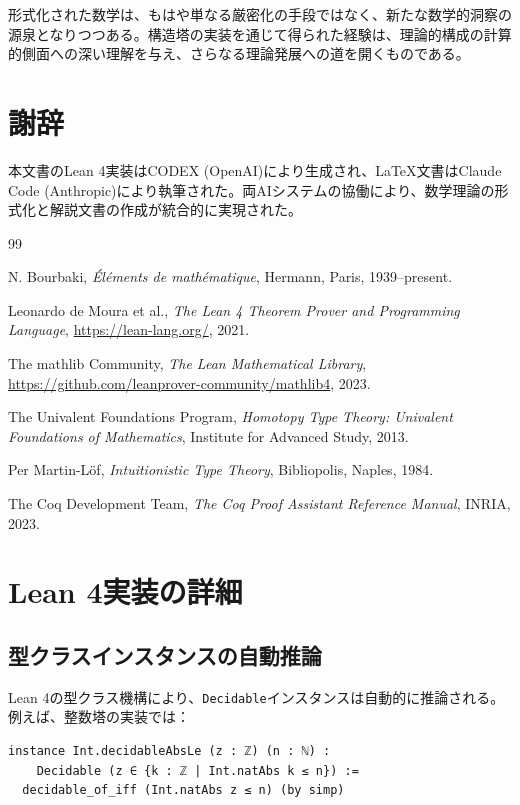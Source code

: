 \documentclass[a4paper,12pt]{ltjsarticle}
\theoremstyle{definition}
\begin{document}
形式化された数学は、もはや単なる厳密化の手段ではなく、新たな数学的洞察の源泉となりつつある。構造塔の実装を通じて得られた経験は、理論的構成の計算的側面への深い理解を与え、さらなる理論発展への道を開くものである。

\section*{謝辞}

本文書のLean 4実装はCODEX (OpenAI)により生成され、\LaTeX 文書はClaude Code (Anthropic)により執筆された。両AIシステムの協働により、数学理論の形式化と解説文書の作成が統合的に実現された。

\begin{thebibliography}{99}

N. Bourbaki, \textit{\'El\'ements de math\'ematique},
Hermann, Paris, 1939--present.

Leonardo de Moura et al., \textit{The Lean 4 Theorem Prover and Programming Language},
\url{https://lean-lang.org/}, 2021.

The mathlib Community, \textit{The Lean Mathematical Library},
\url{https://github.com/leanprover-community/mathlib4}, 2023.

The Univalent Foundations Program,
\textit{Homotopy Type Theory: Univalent Foundations of Mathematics},
Institute for Advanced Study, 2013.

Per Martin-L\"of,
\textit{Intuitionistic Type Theory},
Bibliopolis, Naples, 1984.

The Coq Development Team,
\textit{The Coq Proof Assistant Reference Manual},
INRIA, 2023.

\end{thebibliography}

\appendix

\section{Lean 4実装の詳細}

\subsection{型クラスインスタンスの自動推論}

Lean 4の型クラス機構により、\texttt{Decidable}インスタンスは自動的に推論される。例えば、整数塔の実装では：

\begin{verbatim}
instance Int.decidableAbsLe (z : ℤ) (n : ℕ) :
    Decidable (z ∈ {k : ℤ | Int.natAbs k ≤ n}) :=
  decidable_of_iff (Int.natAbs z ≤ n) (by simp)
\end{verbatim}
\end{document}
